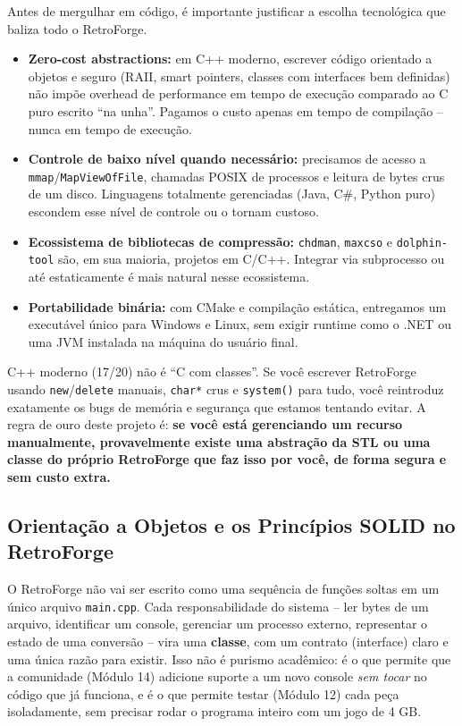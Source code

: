 Antes de mergulhar em código, é importante justificar a escolha tecnológica que baliza todo o RetroForge.

\begin{itemize}
    \item \textbf{Zero-cost abstractions:} em C++ moderno, escrever código orientado a objetos e seguro (RAII, smart pointers, classes com interfaces bem definidas) não impõe overhead de performance em tempo de execução comparado ao C puro escrito ``na unha''. Pagamos o custo apenas em tempo de compilação -- nunca em tempo de execução.
    \item \textbf{Controle de baixo nível quando necessário:} precisamos de acesso a \texttt{mmap}/\texttt{MapViewOfFile}, chamadas POSIX de processos e leitura de bytes crus de um disco. Linguagens totalmente gerenciadas (Java, C\#, Python puro) escondem esse nível de controle ou o tornam custoso.
    \item \textbf{Ecossistema de bibliotecas de compressão:} \texttt{chdman}, \texttt{maxcso} e \texttt{dolphin-tool} são, em sua maioria, projetos em C/C++. Integrar via subprocesso ou até estaticamente é mais natural nesse ecossistema.
    \item \textbf{Portabilidade binária:} com CMake e compilação estática, entregamos um executável único para Windows e Linux, sem exigir runtime como o .NET ou uma JVM instalada na máquina do usuário final.
\end{itemize}

\begin{CaixaAlerta}
C++ moderno (17/20) não é ``C com classes''. Se você escrever RetroForge usando \texttt{new}/\texttt{delete} manuais, \texttt{char*} crus e \texttt{system()} para tudo, você reintroduz exatamente os bugs de memória e segurança que estamos tentando evitar. A regra de ouro deste projeto é: \textbf{se você está gerenciando um recurso manualmente, provavelmente existe uma abstração da STL ou uma classe do próprio RetroForge que faz isso por você, de forma segura e sem custo extra.}
\end{CaixaAlerta}

\subsection{Orientação a Objetos e os Princípios SOLID no RetroForge}

O RetroForge não vai ser escrito como uma sequência de funções soltas em um único arquivo \texttt{main.cpp}. Cada responsabilidade do sistema -- ler bytes de um arquivo, identificar um console, gerenciar um processo externo, representar o estado de uma conversão -- vira uma \textbf{classe}, com um contrato (interface) claro e uma única razão para existir. Isso não é purismo acadêmico: é o que permite que a comunidade (Módulo 14) adicione suporte a um novo console \textit{sem tocar} no código que já funciona, e é o que permite testar (Módulo 12) cada peça isoladamente, sem precisar rodar o programa inteiro com um jogo de 4 GB.


